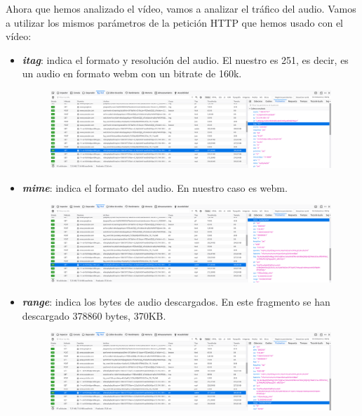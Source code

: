 \documentclass[11pt,a4paper]{article}
\begin{document}
Ahora que hemos analizado el vídeo, vamos a analizar el tráfico del audio. Vamos a utilizar los mismos parámetros de la petición HTTP que hemos usado con el vídeo:

\begin{itemize}
	\item \textbf{\textit{itag}}: indica el formato y resolución del audio. El nuestro es 251, es decir, es un audio en formato webm con un bitrate de 160k.
	
	\begin{figure}[H]
		\centering
		\includegraphics[scale=0.22]{img/audioitag.png}
	\end{figure}
	
	\item \textbf{\textit{mime}}: indica el formato del audio. En nuestro caso es webm.
	
	\begin{figure}[H]
		\centering
		\includegraphics[scale=0.22]{img/audiomime.png}
	\end{figure}	
	
	\item \textbf{\textit{range}}: indica los bytes de audio descargados. En este fragmento se han descargado 378860 bytes, 370KB.
	
	\begin{figure}[H]
		\centering
		\includegraphics[scale=0.22]{img/rangeaudio.png}
	\end{figure}	
	
\end{itemize}
\end{document}
